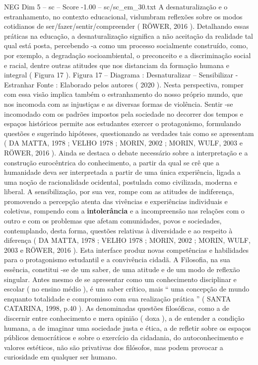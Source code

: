 \begin{textsample}{NEG Dim 5 – sc – Score -1.00 – sc/sc\_em\_30.txt}
A desnaturalização e o estranhamento, no contexto educacional, vislumbram reflexões sobre os modos cotidianos de ser/fazer/sentir/compreender ( RÖWER, 2016 ).
Detalhando essas práticas na educação, a desnaturalização significa a não aceitação da realidade tal qual está posta, percebendo -a como um processo socialmente construído, como, por exemplo, a degradação socioambiental, o preconceito e a discriminação social e racial, dentre outras atitudes que nos distanciam da formação humana e integral ( Figura 17 ).
Figura 17 – Diagrama : Desnaturalizar – Sensibilizar - Estranhar Fonte : Elaborado pelos autores ( 2020 ).
Nesta perspectiva, romper com essa visão implica também o estranhamento do nosso próprio mundo, que nos incomoda com as injustiças e as diversas formas de violência.
Sentir -se incomodado com os padrões impostos pela sociedade no decorrer dos tempos e espaços históricos permite aos estudantes exercer o protagonismo, formulando questões e sugerindo hipóteses, questionando as verdades tais como se apresentam ( DA MATTA, 1978 ; VELHO 1978 ; MORIN, 2002 ; MORIN, WULF, 2003 e RÖWER, 2016 ).
Ainda se destaca o debate necessário sobre a interpretação e a construção eurocêntrica do conhecimento, a partir da qual se crê que a humanidade deva ser interpretada a partir de uma única experiência, ligada a uma noção de racionalidade ocidental, postulada como civilizada, moderna e liberal.
A sensibilização, por sua vez, rompe com as atitudes de indiferença, promovendo a percepção atenta das vivências e experiências individuais e coletivas, rompendo com a \textbf{intolerância} e a incompreensão nas relações com o outro e com os problemas que afetam comunidades, povos e sociedades, contemplando, desta forma, questões relativas à diversidade e ao respeito à diferença ( DA MATTA, 1978 ; VELHO 1978 ; MORIN, 2002 ; MORIN, WULF, 2003 e RÖWER, 2016 ).
Esta interface produz novas competências e habilidades para o protagonismo estudantil e a convivência cidadã.
A Filosofia, na sua essência, constitui -se de um saber, de uma atitude e de um modo de reflexão singular.
Antes mesmo de se apresentar como um conhecimento disciplinar e escolar ( no ensino médio ), é um saber crítico, mais “ uma concepção de mundo enquanto totalidade e compromisso com sua realização prática ” ( SANTA CATARINA, 1998, p.40 ).
As denominadas questões filosóficas, como a de discernir entre conhecimento e mera opinião ( doxa ), a de entender a condição humana, a de imaginar uma sociedade justa e ética, a de refletir sobre os espaços públicos democráticos e sobre o exercício da cidadania, do autoconhecimento e valores estéticos, não são privativas dos filósofos, mas podem provocar a curiosidade em qualquer ser humano.

\end{textsample}
